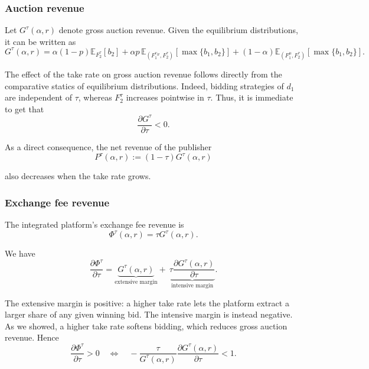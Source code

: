 \documentclass[11pt]{article}
\theoremstyle{plain}
\theoremstyle{definition}
\theoremstyle{plain}
\theoremstyle{plain}
\theoremstyle{plain}
\theoremstyle{plain}
\numberwithin{equation}{section}
\begin{document}
\subsubsection{Auction revenue}

Let $ G^\tau(\alpha,r) $ denote gross auction revenue. Given the equilibrium distributions, it can be written as
\[
G^\tau(\alpha,r)
=
\alpha(1-p)\mathbb E_{F_2^\tau}[b_2]
+
\alpha p\,\mathbb E_{\left( F_1^{v_H},F_2^\tau \right)}
\left[
\max\{b_1,b_2\}
\right]
+
(1-\alpha)\mathbb E_{\left( F_1^{\mu},F_2^\tau \right)}
\left[
\max\{b_1,b_2\}
\right].
\]

\noindent The effect of the take rate on gross auction revenue follows directly from the comparative statics of equilibrium distributions. Indeed, bidding strategies of $ d_1 $ are independent of $ \tau $, whereas $ F_2^\tau $ increases pointwise in $ \tau $. Thus, it is immediate to get that
\[
\frac{\partial G^\tau}{\partial \tau} < 0.
\]

\vspace{0.2cm}

\noindent As a direct consequence, the net revenue of the publisher
\[
P^\tau (\alpha, r) := (1 - \tau)G^\tau(\alpha,r)
\]

\noindent also decreases when the take rate grows.

\subsubsection{Exchange fee revenue}

The integrated platform's exchange fee revenue is
\[
\Phi^\tau(\alpha,r)
=
\tau G^\tau(\alpha,r).
\]

\vspace{0.2cm}

\noindent We have
\[
\frac{\partial \Phi^\tau}{\partial \tau}
=
\underbrace{G^\tau(\alpha,r)}_\text{extensive margin}
+ \
\underbrace{\tau\frac{\partial G^\tau(\alpha,r)}{\partial \tau}}_\text{intensive margin}.
\]

\vspace{0.2cm}

\noindent The extensive margin is positive: a higher take rate lets the platform extract a larger share of any given winning bid. The intensive margin is instead negative. As we showed, a higher take rate softens bidding, which reduces gross auction revenue. Hence
\[
\frac{\partial \Phi^\tau}{\partial \tau}>0
\quad\Longleftrightarrow\quad
-\frac{\tau}{G^\tau(\alpha,r)}
\frac{\partial G^\tau(\alpha,r)}{\partial \tau}<1.
\]
\end{document}
